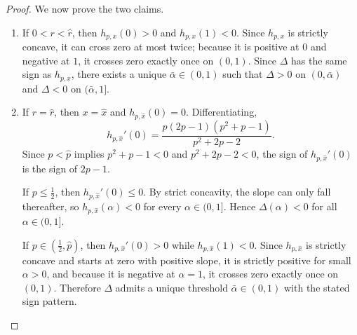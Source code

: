 \begin{proof}
    

    \noindent We now prove the two claims.

    \begin{enumerate}
        \item If $0 < r < \hat{r}$, then $h_{p,x}(0) > 0$ and $h_{p,x}(1) < 0$. Since $h_{p,x}$ is strictly concave, it can cross zero at most twice; because it is positive at $0$ and negative at $1$, it crosses zero exactly once on $(0,1)$. Since $\Delta$ has the same sign as $h_{p,x}$, there exists a unique $\bar{\alpha} \in (0,1)$ such that $\Delta > 0$ on $(0,\bar{\alpha})$ and $\Delta < 0$ on $(\bar{\alpha},1]$.

        \item If $r = \hat{r}$, then $x = \hat{x}$ and $h_{p,\hat{x}}(0)=0$. Differentiating,
        \begin{equation*}
            h_{p,\hat{x}}'(0) = \frac{p(2p-1)(p^2+p-1)}{p^2+2p-2}.
        \end{equation*}
        Since $p < \hat{p}$ implies $p^2+p-1 < 0$ and $p^2+2p-2 < 0$, the sign of $h_{p,\hat{x}}'(0)$ is the sign of $2p-1$.

        

        \noindent If $p \leq \frac{1}{2}$, then $h_{p,\hat{x}}'(0) \leq 0$. By strict concavity, the slope can only fall thereafter, so $h_{p,\hat{x}}(\alpha) < 0$ for every $\alpha \in (0,1]$. Hence $\Delta(\alpha) < 0$ for all $\alpha \in (0,1]$.

        

        \noindent If $p \in \left(\frac{1}{2}, \hat{p}\right)$, then $h_{p,\hat{x}}'(0) > 0$ while $h_{p,\hat{x}}(1) < 0$. Since $h_{p,\hat{x}}$ is strictly concave and starts at zero with positive slope, it is strictly positive for small $\alpha > 0$, and because it is negative at $\alpha = 1$, it crosses zero exactly once on $(0,1)$. Therefore $\Delta$ admits a unique threshold $\bar{\alpha} \in (0,1)$ with the stated sign pattern.
    \end{enumerate}
\end{proof}

